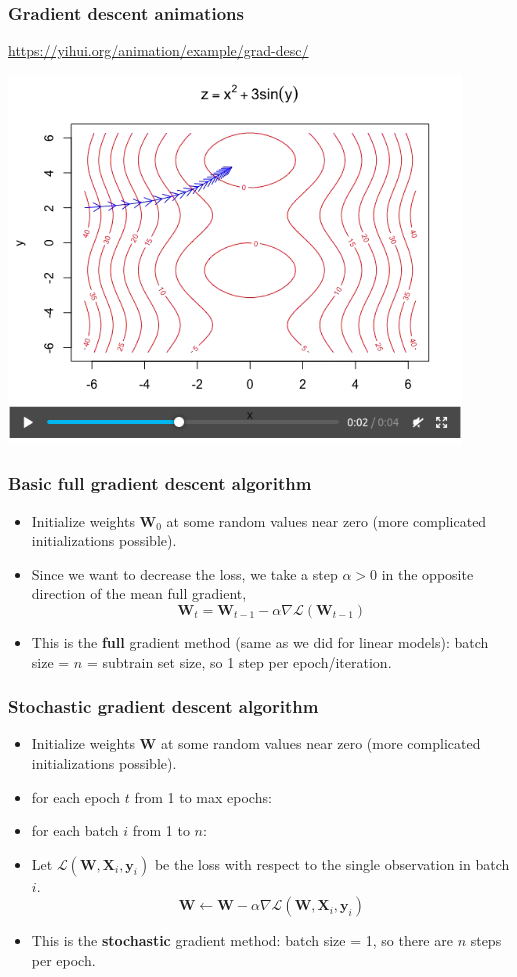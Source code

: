 \documentclass{beamer}
\begin{document}
\begin{frame}
  \frametitle{Gradient descent animations}
  \url{https://yihui.org/animation/example/grad-desc/}

  \includegraphics[width=0.9\textwidth]{screenshot-gradient-descent}
\end{frame}

\begin{frame}[fragile]
  \frametitle{Basic full gradient descent algorithm}
  \begin{itemize}
  \item Initialize weights $\mathbf W_0$ at some random values near
    zero (more complicated initializations possible).
  \item Since we want to decrease the loss, we take a step $\alpha>0$ in the
    opposite direction of the mean full gradient,
  $$
\mathbf W_t = \mathbf W_{t-1} - \alpha \nabla \mathcal L(\mathbf W_{t-1})
$$
\item This is the \textbf{full} gradient method (same as we did for
  linear models): batch size = $n$ =
  subtrain set size, so 1 step per epoch/iteration.
\end{itemize}

\end{frame}

\begin{frame}[fragile]
  \frametitle{Stochastic gradient descent algorithm}
  \begin{itemize}
  \item Initialize weights $\mathbf W$ at some random values near
    zero (more complicated initializations possible).
  \item for each epoch $t$ from 1 to max epochs:
  \item for each batch $i$ from 1 to $n$:
  \item Let $\mathcal L( \mathbf W, \mathbf X_i, \mathbf y_i )$ be the loss with
    respect to the single observation in batch $i$.
$$
\mathbf W \gets \mathbf W - \alpha \nabla \mathcal L(\mathbf W, \mathbf X_i, \mathbf y_i)
$$
\item This is the \textbf{stochastic} gradient method: batch size = 1,
  so there are $n$ steps per epoch.
\end{itemize}

\end{frame}
\end{document}
